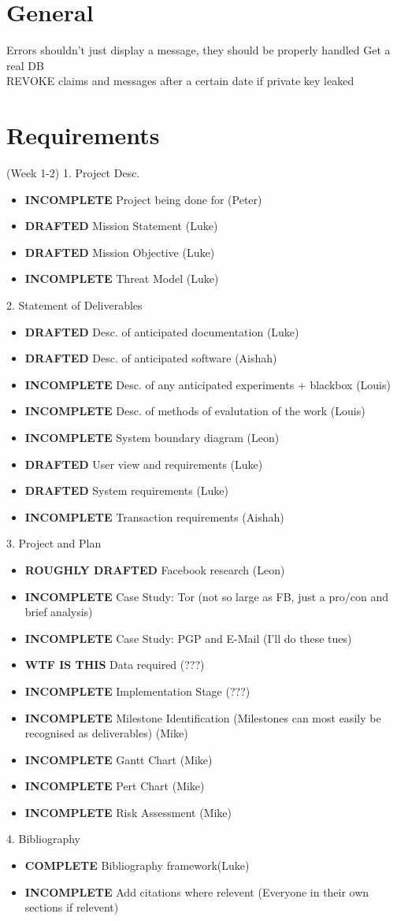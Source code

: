 \section{General}
Errors shouldn't just display a message, they should be properly handled
Get a real DB\\
REVOKE claims and messages after a certain date if private key leaked\\

\section{Requirements} (Week 1-2)
1. Project Desc.
\begin{itemize}
\item \textbf{INCOMPLETE} Project being done for (Peter)
\item \textbf{DRAFTED} Mission Statement (Luke)
\item \textbf{DRAFTED} Mission Objective (Luke)
\item \textbf{INCOMPLETE} Threat Model (Luke)
\end{itemize}

2. Statement of Deliverables
\begin{itemize}
\item \textbf{DRAFTED} Desc. of anticipated documentation (Luke)
\item \textbf{DRAFTED} Desc. of anticipated software (Aishah)
\item \textbf{INCOMPLETE} Desc. of any anticipated experiments + blackbox (Louis)
\item \textbf{INCOMPLETE} Desc. of methods of evalutation of the work (Louis)
\item \textbf{INCOMPLETE} System boundary diagram (Leon)
\item \textbf{DRAFTED} User view and requirements (Luke)
\item \textbf{DRAFTED} System requirements (Luke)
\item \textbf{INCOMPLETE} Transaction requirements (Aishah)
\end{itemize}

3. Project and Plan
\begin{itemize}
\item \textbf{ROUGHLY DRAFTED} Facebook research (Leon)
\item \textbf{INCOMPLETE} Case Study: Tor (not so large as FB, just a pro/con and brief analysis)
\item \textbf{INCOMPLETE} Case Study: PGP and E-Mail (I'll do these tues)
\item \textbf{WTF IS THIS} Data required (???)
\item \textbf{INCOMPLETE} Implementation Stage (???)
\item \textbf{INCOMPLETE} Milestone Identification (Milestones can most easily be recognised as deliverables) (Mike)
\item \textbf{INCOMPLETE} Gantt Chart (Mike)
\item \textbf{INCOMPLETE} Pert Chart (Mike)
\item \textbf{INCOMPLETE} Risk Assessment (Mike)
\end{itemize}

4. Bibliography
\begin{itemize}
\item \textbf{COMPLETE} Bibliography framework(Luke)
\item \textbf{INCOMPLETE} Add citations where relevent (Everyone in their own sections if relevent)
\end{itemize}
